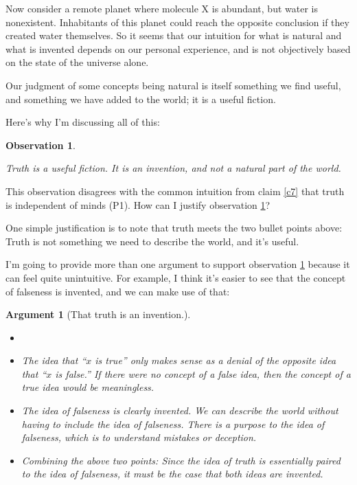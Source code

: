 \documentclass[11pt, oneside]{article}   	%
\newtheorem{obs}{Observation}
\newtheorem{argt}{Argument}
\begin{document}
Now consider a remote planet where molecule X is abundant, but water is
nonexistent. Inhabitants of this planet could reach the opposite conclusion if
they created water themselves. So it seems that our intuition for what is
natural and what is invented depends on our personal experience, and is
not objectively based on the state of the universe alone.

Our judgment of some concepts being natural is itself something
we find useful, and something we have added to the world; it is a useful
fiction.

Here's why I'm discussing all of this:
\newcommand{\obsthree}{
    Truth is a useful fiction. It is an invention, and not a natural part of the
    world.
}
\begin{obs}\label{o3}
    \obsthree
\end{obs}

This observation disagrees with the common intuition from claim \ref{c7} that
truth is independent of minds (P1). How can I justify observation \ref{o3}?

One simple justification is to note that truth meets the two bullet points
above: Truth is not something we need to describe the world, and it's useful.

I'm going to provide more than one argument to support observation \ref{o3}
because it can feel quite unintuitive.
For example, I think it's easier to see that the concept
of falseness is invented, and we can make use of that:
\begin{argt}[That truth is an invention.]\label{a2}
    \normalfont
    \begin{itemize}
        \item[]
        \item
            The idea that ``$x$ is true'' only makes sense as a denial of the
            opposite idea that ``$x$ is false.'' If there were no concept of a
            false idea, then the concept of a true idea would be meaningless.
        \item
            The idea of falseness is clearly invented. We can describe
            the world without having to include the idea of falseness.
            There is a purpose to the idea of falseness, which is to understand
            mistakes or deception.
        \item
            Combining the above two points:
            Since the idea of truth is essentially paired to the idea of
            falseness,
            it must be the case that both ideas are invented.
    \end{itemize}
\end{argt}
\end{document}
